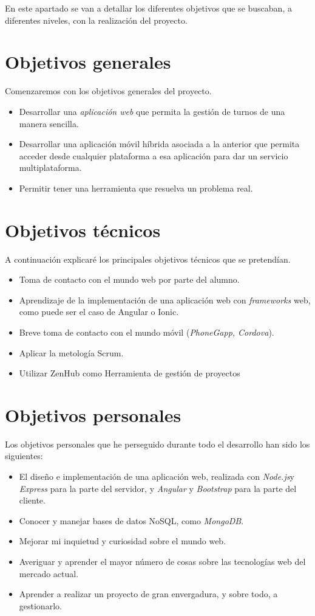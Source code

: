 
En este apartado se van a detallar los diferentes objetivos que se buscaban, a diferentes niveles, con la realización del proyecto.

\section{Objetivos generales}\label{objetivos-generales}
Comenzaremos con los objetivos generales del proyecto. 
\begin{itemize}
\tightlist
\item
  Desarrollar una  \emph{aplicación web} que permita la gestión de turnos de una manera sencilla. 
\item
  Desarrollar una aplicación móvil híbrida asociada a la anterior que permita acceder desde cualquier plataforma a esa aplicación para dar un servicio multiplataforma. 
\item
  Permitir tener una herramienta que resuelva un problema real.
\end{itemize}

\section{Objetivos técnicos}\label{objetivos-tecnicos}
A continuación explicaré los principales objetivos técnicos que se pretendían. 
\begin{itemize}
\tightlist
\item
  Toma de contacto con el mundo web por parte del alumno.
 \item
  Aprendizaje de la implementación de una aplicación web con  \emph{frameworks} web, como puede ser el caso de Angular o Ionic. 
\item
  Breve toma de contacto con el mundo móvil (\emph{PhoneGapp, Cordova}).
\item
 Aplicar la metología Scrum.
 \item
 Utilizar ZenHub como Herramienta de gestión de proyectos
\end{itemize}

\section{Objetivos personales}\label{objetivos-personales}
Los objetivos personales que he perseguido durante todo el desarrollo han sido los siguientes:
\begin{itemize}
\tightlist
\item
 El diseño e implementación de una aplicación web, realizada con \emph{Node.js}y \emph{Express} para la parte del
servidor, y \emph{Angular} y \emph{Bootstrap} para la parte del cliente. 
\item
  Conocer y manejar bases de datos NoSQL, como \emph{MongoDB}.
\item
  Mejorar mi inquietud y curiosidad sobre el mundo web. 
\item
  Averiguar y aprender el mayor número de cosas sobre las tecnologías web del mercado actual. 
\item
  Aprender a realizar un proyecto de gran envergadura, y sobre todo, a gestionarlo.
\end{itemize}

